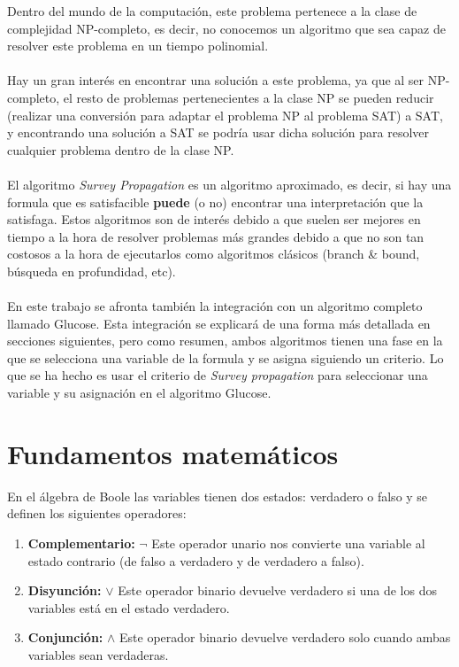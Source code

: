 Dentro del mundo de la computación, este problema pertenece a la clase de complejidad NP-completo, es decir, no conocemos un algoritmo que sea capaz de resolver este problema en un tiempo polinomial.\\\\
Hay un gran interés en encontrar una solución a este problema, ya que al ser NP-completo, el resto de problemas pertenecientes a la clase NP se pueden reducir (realizar una conversión para adaptar el problema NP al problema SAT) a SAT, y encontrando una solución a SAT se podría usar dicha solución para resolver cualquier problema dentro de la clase NP.\\\\
El algoritmo \textit{Survey Propagation} es un algoritmo aproximado, es decir, si hay una formula que es satisfacible \textbf{puede} (o no) encontrar una interpretación que la satisfaga.
Estos algoritmos son de interés debido a que suelen ser mejores en tiempo a la hora de resolver problemas más grandes debido a que no son tan costosos a la hora de ejecutarlos como algoritmos clásicos (branch \& bound, búsqueda en profundidad, etc).\\\\
En este trabajo se afronta también la integración con un algoritmo completo llamado Glucose. Esta integración se explicará de una forma más detallada en secciones siguientes, pero como resumen, ambos algoritmos tienen una fase en la que se selecciona una variable de la formula y se asigna siguiendo un criterio. Lo que se ha hecho es usar el criterio de \textit{Survey propagation} para seleccionar una variable y su asignación en el algoritmo Glucose.
\pagebreak
\section{Fundamentos matemáticos}
En el álgebra de Boole las variables tienen dos estados: verdadero o falso y se definen los siguientes operadores:
\begin{enumerate}[1.]
	\item \textbf{Complementario:} $\neg$ Este operador unario nos convierte una variable al estado contrario (de falso a verdadero y de verdadero a falso).
	\item \textbf{Disyunción:} $\lor$ Este operador binario devuelve verdadero si una de los dos variables está en el estado verdadero.
	\item \textbf{Conjunción:} $\land$ Este operador binario devuelve verdadero solo cuando ambas variables sean verdaderas.
\end{enumerate}
